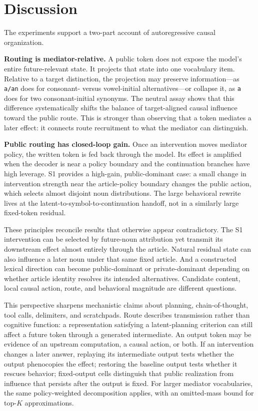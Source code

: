 \documentclass[
]{article}
\begin{document}
\section{Discussion}\label{discussion}

The experiments support a two-part account of autoregressive causal
organization.

\textbf{Routing is mediator-relative.} A public token does not expose
the model's entire future-relevant state. It projects that state into
one vocabulary item. Relative to a target distinction, the projection
may preserve information---as \texttt{a/an} does for consonant- versus
vowel-initial alternatives---or collapse it, as \texttt{a} does for two
consonant-initial synonyms. The neutral assay shows that this difference
systematically shifts the balance of target-aligned causal influence
toward the public route. This is stronger than observing that a token
mediates a later effect: it connects route recruitment to what the
mediator can distinguish.

\textbf{Public routing has closed-loop gain.} Once an intervention moves
mediator policy, the written token is fed back through the model. Its
effect is amplified when the decoder is near a policy boundary and the
continuation branches have high leverage. S1 provides a high-gain,
public-dominant case: a small change in intervention strength near the
article-policy boundary changes the public action, which selects almost
disjoint noun distributions. The large behavioral rewrite lives at the
latent-to-symbol-to-continuation handoff, not in a similarly large
fixed-token residual.

These principles reconcile results that otherwise appear contradictory.
The S1 intervention can be selected by future-noun attribution yet
transmit its downstream effect almost entirely through the article.
Natural residual state can also influence a later noun under that same
fixed article. And a constructed lexical direction can become
public-dominant or private-dominant depending on whether article
identity resolves its intended alternatives. Candidate content, local
causal action, route, and behavioral magnitude are different questions.

This perspective sharpens mechanistic claims about planning,
chain-of-thought, tool calls, delimiters, and scratchpads. Route
describes transmission rather than cognitive function: a representation
satisfying a latent-planning criterion can still affect a future token
through a generated intermediate. An output token may be evidence of an
upstream computation, a causal action, or both. If an intervention
changes a later answer, replaying its intermediate output tests whether
the output phenocopies the effect; restoring the baseline output tests
whether it rescues behavior; fixed-output cells distinguish that public
realization from influence that persists after the output is fixed. For
larger mediator vocabularies, the same policy-weighted decomposition
applies, with an omitted-mass bound for top-\(K\) approximations.
\end{document}
